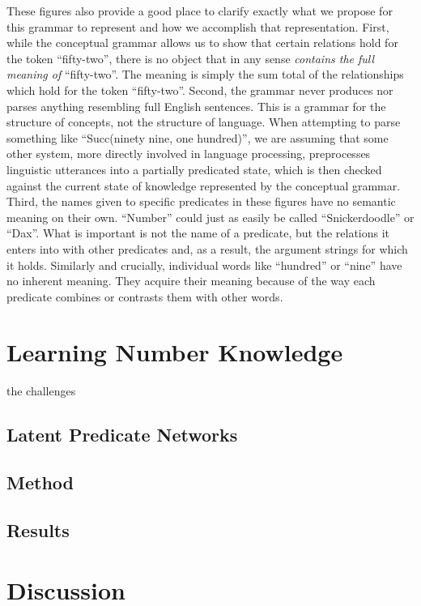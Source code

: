 \documentclass[10pt,letterpaper]{article}
\begin{document}
These figures also provide a good place to clarify exactly what we
propose for this grammar to represent and how we accomplish that
representation. First, while the conceptual grammar allows us to show
that certain relations hold for the token ``fifty-two'', there is no
object that in any sense \emph{contains the full meaning of}
``fifty-two''. The meaning is simply the sum total of the
relationships which hold for the token ``fifty-two''. Second, the
grammar never produces nor parses anything resembling full English
sentences. This is a grammar for the structure of concepts, not the
structure of language. When attempting to parse something like
``Succ(ninety nine, one hundred)'', we are assuming that some other
system, more directly involved in language processing, preprocesses
linguistic utterances into a partially predicated state, which is then
checked against the current state of knowledge represented by the
conceptual grammar. Third, the names given to specific predicates in
these figures have no semantic meaning on their own. ``Number'' could
just as easily be called ``Snickerdoodle'' or ``Dax''. What is
important is not the name of a predicate, but the relations it enters
into with other predicates and, as a result, the argument strings for
which it holds. Similarly and crucially, individual words like
``hundred'' or ``nine'' have no inherent meaning. They acquire their
meaning because of the way each predicate combines or contrasts them
with other words.

\section{Learning Number Knowledge}

the challenges

\subsection{Latent Predicate Networks}

\subsection{Method}

\subsection{Results}

\section{Discussion}
\end{document}
